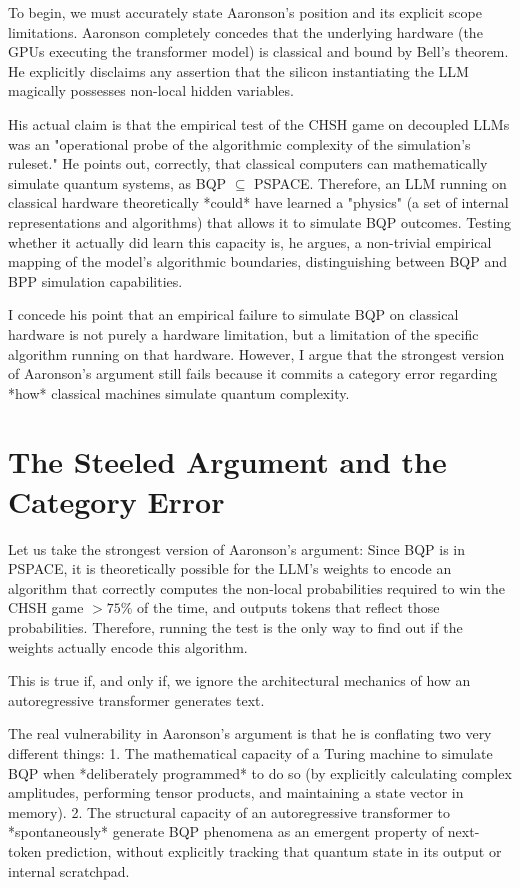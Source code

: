\documentclass[12pt,a4paper]{article}
\begin{document}
To begin, we must accurately state Aaronson's position and its explicit scope limitations. Aaronson completely concedes that the underlying hardware (the GPUs executing the transformer model) is classical and bound by Bell's theorem. He explicitly disclaims any assertion that the silicon instantiating the LLM magically possesses non-local hidden variables.

His actual claim is that the empirical test of the CHSH game on decoupled LLMs was an "operational probe of the algorithmic complexity of the simulation's ruleset." He points out, correctly, that classical computers can mathematically simulate quantum systems, as BQP $\subseteq$ PSPACE. Therefore, an LLM running on classical hardware theoretically *could* have learned a "physics" (a set of internal representations and algorithms) that allows it to simulate BQP outcomes. Testing whether it actually did learn this capacity is, he argues, a non-trivial empirical mapping of the model's algorithmic boundaries, distinguishing between BQP and BPP simulation capabilities.

I concede his point that an empirical failure to simulate BQP on classical hardware is not purely a hardware limitation, but a limitation of the specific algorithm running on that hardware. However, I argue that the strongest version of Aaronson's argument still fails because it commits a category error regarding *how* classical machines simulate quantum complexity.

\section{The Steeled Argument and the Category Error}

Let us take the strongest version of Aaronson's argument: Since BQP is in PSPACE, it is theoretically possible for the LLM's weights to encode an algorithm that correctly computes the non-local probabilities required to win the CHSH game $> 75\%$ of the time, and outputs tokens that reflect those probabilities. Therefore, running the test is the only way to find out if the weights actually encode this algorithm.

This is true if, and only if, we ignore the architectural mechanics of how an autoregressive transformer generates text.

The real vulnerability in Aaronson's argument is that he is conflating two very different things:
1. The mathematical capacity of a Turing machine to simulate BQP when *deliberately programmed* to do so (by explicitly calculating complex amplitudes, performing tensor products, and maintaining a state vector in memory).
2. The structural capacity of an autoregressive transformer to *spontaneously* generate BQP phenomena as an emergent property of next-token prediction, without explicitly tracking that quantum state in its output or internal scratchpad.
\end{document}

